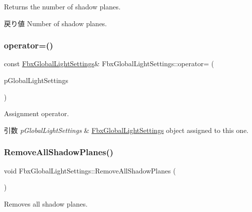 Returns the number of shadow planes. \begin{DoxyReturn}{戻り値}
Number of shadow planes. 
\end{DoxyReturn}
\mbox{\label{class_fbx_global_light_settings_a9a3f96233b7ede9ad5f804d10f5e024b}} 
\subsubsection{\texorpdfstring{operator=()}{operator=()}}
{\footnotesize\ttfamily const \hyperlink{class_fbx_global_light_settings}{Fbx\+Global\+Light\+Settings}\& Fbx\+Global\+Light\+Settings\+::operator= (\begin{DoxyParamCaption}\item[{const \hyperlink{class_fbx_global_light_settings}{Fbx\+Global\+Light\+Settings} \&}]{p\+Global\+Light\+Settings }\end{DoxyParamCaption})}

Assignment operator. 
\begin{DoxyParams}{引数}
{\em p\+Global\+Light\+Settings} & \hyperlink{class_fbx_global_light_settings}{Fbx\+Global\+Light\+Settings} object assigned to this one. \\
\hline
\end{DoxyParams}
\mbox{\label{class_fbx_global_light_settings_af46551f80ebf82ab4d9d338ba41fce8c}} 
\subsubsection{\texorpdfstring{Remove\+All\+Shadow\+Planes()}{RemoveAllShadowPlanes()}}
{\footnotesize\ttfamily void Fbx\+Global\+Light\+Settings\+::\+Remove\+All\+Shadow\+Planes (\begin{DoxyParamCaption}{ }\end{DoxyParamCaption})}



Removes all shadow planes. 

\mbox{\label{class_fbx_global_light_settings_a9f9a67ac3a66bb905d987a0838c9e30e}} 
